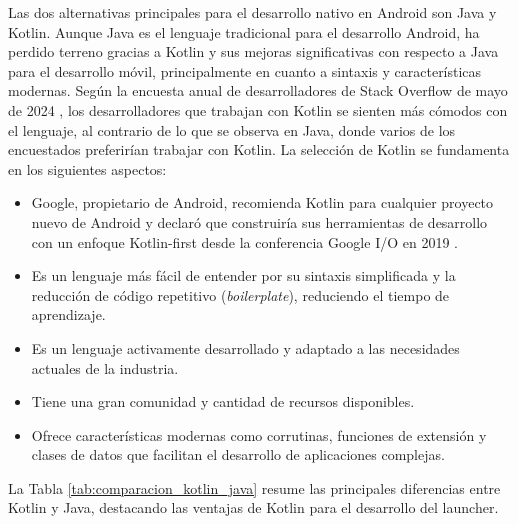 Las dos alternativas principales para el desarrollo nativo en Android son Java y Kotlin. Aunque Java es el lenguaje tradicional para el desarrollo Android, ha perdido terreno gracias a Kotlin y sus mejoras significativas con respecto a Java para el desarrollo móvil, principalmente en cuanto a sintaxis y características modernas. Según la encuesta anual de desarrolladores de Stack Overflow de mayo de 2024 \cite{Stackoverflow2024}, los desarrolladores que trabajan con Kotlin se sienten más cómodos con el lenguaje, al contrario de lo que se observa en Java, donde varios de los encuestados preferirían trabajar con Kotlin. La selección de Kotlin se fundamenta en los siguientes aspectos:

\begin{itemize}
    \item Google, propietario de Android, recomienda Kotlin para cualquier proyecto nuevo de Android y declaró que construiría sus herramientas de desarrollo con un enfoque Kotlin-first desde la conferencia Google I/O en 2019 \cite{Google2019}.
    \item Es un lenguaje más fácil de entender por su sintaxis simplificada y la reducción de código repetitivo (\textit{boilerplate}), reduciendo el tiempo de aprendizaje.
    \item Es un lenguaje activamente desarrollado y adaptado a las necesidades actuales de la industria.
    \item Tiene una gran comunidad y cantidad de recursos disponibles.
    \item Ofrece características modernas como corrutinas, funciones de extensión y clases de datos que facilitan el desarrollo de aplicaciones complejas.
\end{itemize}

La Tabla \ref{tab:comparacion_kotlin_java} resume las principales diferencias entre Kotlin y Java, destacando las ventajas de Kotlin para el desarrollo del launcher.

